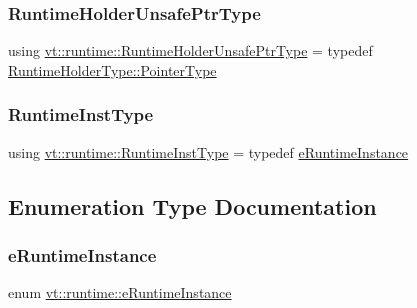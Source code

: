\subsubsection{\texorpdfstring{Runtime\+Holder\+Unsafe\+Ptr\+Type}{RuntimeHolderUnsafePtrType}}
{\footnotesize\ttfamily using \hyperlink{namespacevt_1_1runtime_a69931905b04961a874e4a70a43083a83}{vt\+::runtime\+::\+Runtime\+Holder\+Unsafe\+Ptr\+Type} = typedef \hyperlink{structvt_1_1runtime_1_1_runtime_holder_a9740e8aa7487fcf38b67a7e160d7b046}{Runtime\+Holder\+Type\+::\+Pointer\+Type}}

\mbox{\label{namespacevt_1_1runtime_a012376d47cd009c2e6305f17de9fcfe9}} 
\subsubsection{\texorpdfstring{Runtime\+Inst\+Type}{RuntimeInstType}}
{\footnotesize\ttfamily using \hyperlink{namespacevt_1_1runtime_afca910c1b38b3975f7c1da8001a77d58}{vt\+::runtime\+::\+Runtime\+Inst\+Type} = typedef \hyperlink{namespacevt_1_1runtime_afca910c1b38b3975f7c1da8001a77d58}{e\+Runtime\+Instance}}



\subsection{Enumeration Type Documentation}
\mbox{\label{namespacevt_1_1runtime_afca910c1b38b3975f7c1da8001a77d58}} 
\subsubsection{\texorpdfstring{e\+Runtime\+Instance}{eRuntimeInstance}}
{\footnotesize\ttfamily enum \hyperlink{namespacevt_1_1runtime_afca910c1b38b3975f7c1da8001a77d58}{vt\+::runtime\+::e\+Runtime\+Instance}}

